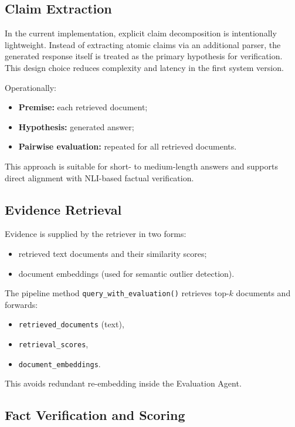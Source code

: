 \subsection{Claim Extraction}
In the current implementation, explicit claim decomposition is intentionally lightweight. Instead of extracting atomic claims via an additional parser, the generated response itself is treated as the primary hypothesis for verification. This design choice reduces complexity and latency in the first system version.

Operationally:
\begin{itemize}
    \item \textbf{Premise:} each retrieved document;
    \item \textbf{Hypothesis:} generated answer;
    \item \textbf{Pairwise evaluation:} repeated for all retrieved documents.
\end{itemize}

This approach is suitable for short- to medium-length answers and supports direct alignment with NLI-based factual verification.

\subsection{Evidence Retrieval}
Evidence is supplied by the retriever in two forms:
\begin{itemize}
    \item retrieved text documents and their similarity scores;
    \item document embeddings (used for semantic outlier detection).
\end{itemize}

The pipeline method \texttt{query\_with\_evaluation()} retrieves top-$k$ documents and forwards:
\begin{itemize}
    \item \texttt{retrieved\_documents} (text),
    \item \texttt{retrieval\_scores},
    \item \texttt{document\_embeddings}.
\end{itemize}
This avoids redundant re-embedding inside the Evaluation Agent.

\subsection{Fact Verification and Scoring}
\label{subsec:ch5_nli}

